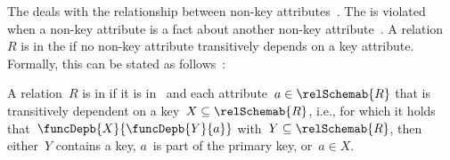 %
\label{sec:normalForm:3}%
%
The  deals with the relationship between non-key attributes~\cite{C1971FNOTDBRM,C1971NDBSABT,K1983ASGTFNFIRDT,D2003AITDS,EN2015FODS}.
The  is violated when a non-key attribute is a fact about another non-key attribute~\cite{K1983ASGTFNFIRDT}.
A relation~$R$ is in the  if no non-key attribute transitively depends on a key attribute.
Formally, this can be stated as follows~\cite{SS2005EIDDDFDB:SDWSD2}:%
%
\begin{definition}%
\label{def:3nf}%
A relation~$R$ is in  if it is in~ and each attribute~$a\in\relSchemab{R}$ that is transitively dependent on a key~$X\subseteq\relSchemab{R}$, i.e., for which it holds that~$\funcDepb{X}{\funcDepb{Y}{a}}$ with~$Y\subseteq\relSchemab{R}$, then either~$Y$ contains a key, $a$~is part of the primary key, or~$a\in X$.%
\end{definition}%
%
\endhsection%
%
